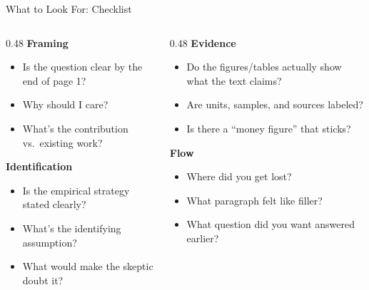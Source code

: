 \begin{frame}{What to Look For: Checklist}
  \footnotesize
  \begin{columns}[T]
    \begin{column}{0.48\textwidth}
      \textbf{\textcolor{usfgreen}{Framing}}
      \begin{itemize}\setlength\itemsep{0pt}
        \item Is the question clear by the end of page 1?
        \item Why should I care?
        \item What's the contribution vs.\ existing work?
      \end{itemize}

      \vspace{4pt}

      \textbf{\textcolor{usfgreen}{Identification}}
      \begin{itemize}\setlength\itemsep{0pt}
        \item Is the empirical strategy stated clearly?
        \item What's the identifying assumption?
        \item What would make the skeptic doubt it?
      \end{itemize}
    \end{column}
    \begin{column}{0.48\textwidth}
      \textbf{\textcolor{usfgreen}{Evidence}}
      \begin{itemize}\setlength\itemsep{0pt}
        \item Do the figures/tables actually show what the text claims?
        \item Are units, samples, and sources labeled?
        \item Is there a ``money figure'' that sticks?
      \end{itemize}

      \vspace{4pt}

      \textbf{\textcolor{usfgreen}{Flow}}
      \begin{itemize}\setlength\itemsep{0pt}
        \item Where did you get lost?
        \item What paragraph felt like filler?
        \item What question did you want answered earlier?
      \end{itemize}
    \end{column}
  \end{columns}
\end{frame}

